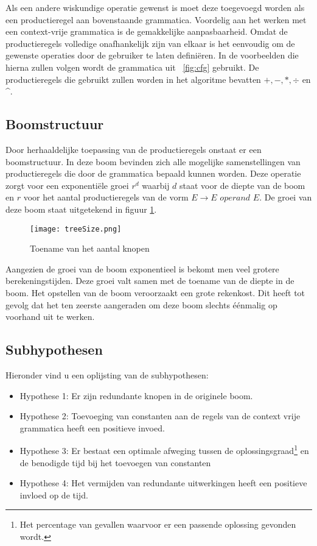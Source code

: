 \documentclass[Main.tex]{subfiles}
\begin{document}
Als een andere wiskundige operatie gewenst is moet deze toegevoegd worden als een productieregel aan bovenstaande grammatica. Voordelig aan het werken met een context-vrije grammatica is de gemakkelijke aanpasbaarheid. Omdat de productieregels volledige onafhankelijk zijn van elkaar is het eenvoudig om de gewenste operaties door de gebruiker te laten defini\"eren. In de voorbeelden die hierna zullen volgen wordt de grammatica uit ~\ref{fig:cfg} gebruikt. De productieregels die gebruikt zullen worden in het algoritme bevatten $+, -, \ast, \div$ en \^{}.

\subsection{Boomstructuur}

Door herhaaldelijke toepassing van de productieregels onstaat er een boomstructuur. In deze boom bevinden zich alle mogelijke samenstellingen van productieregels die door de grammatica bepaald kunnen worden. Deze operatie zorgt voor een exponenti\"ele groei $r^{d}$ waarbij $d$ staat voor de diepte van de boom en $r$ voor het aantal productieregels van de vorm $E \rightarrow E$  $operand$ $ E$. De groei van deze boom staat uitgetekend in figuur \ref{fig:treeSize}.

\begin{figure}[!htb]
\centering
\texttt{[image: treeSize.png]}
\caption{Toename van het aantal knopen}
\label{fig:treeSize}
\end{figure}

Aangezien de groei van de boom exponentieel is bekomt men veel grotere berekeningstijden. Deze groei valt samen met de toename van de diepte in de boom. Het opstellen van de boom veroorzaakt een grote rekenkost. Dit heeft tot gevolg dat het ten zeerste aangeraden om deze boom slechts \'e\'enmalig op voorhand uit te werken.

\subsection{Subhypothesen} \label{ssec:subhypothesen}
\par Hieronder vind u een oplijsting van de subhypothesen:

\begin{itemize}
\item Hypothese 1: Er zijn redundante knopen in de originele boom.
\item Hypothese 2: Toevoeging van constanten aan de regels van de context vrije grammatica heeft een positieve invoed.
\item Hypothese 3: Er bestaat een optimale afweging tussen de oplossingsgraad\footnote{\label{note:oplossingsgraad}Het percentage van gevallen waarvoor er een passende oplossing gevonden wordt.} en de benodigde tijd bij het toevoegen van constanten
\item Hypothese 4: Het vermijden van redundante uitwerkingen heeft een positieve invloed op de tijd. 
\end{itemize}
\end{document}
